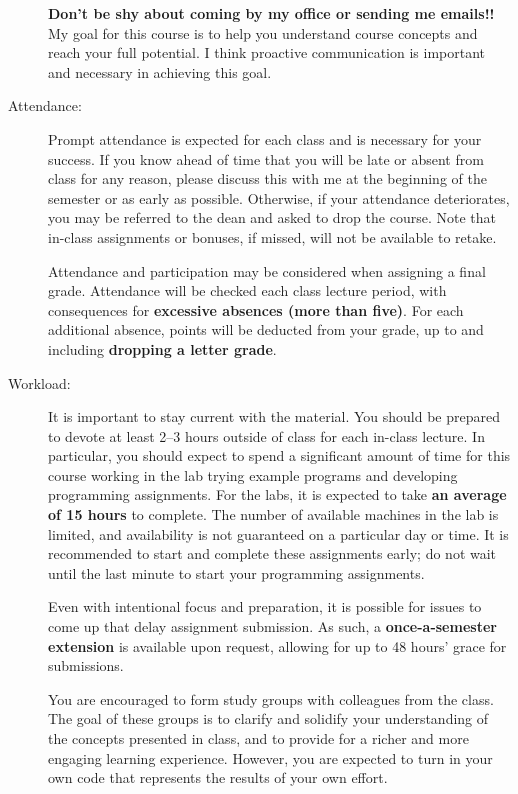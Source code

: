\documentclass [letterpaper,11pt]{article}
\begin{document}
\begin{description}
\textbf{Don't be shy about coming by my office or sending me emails!!}  My goal for this course is to help you understand course concepts and reach your full potential. I think proactive communication is important and necessary in achieving this goal.

\item[Attendance:]
Prompt attendance is expected for each class and is necessary for your success. If you know ahead of time that you will be late or
absent from class for any reason, please discuss this with me at the beginning of the semester
or as early as possible. Otherwise, if your attendance deteriorates, you may be referred to the dean and asked to drop the course. Note that in-class assignments or bonuses, if missed, will not be available to retake.

Attendance and participation may be considered when assigning a final grade.
Attendance will be checked each class lecture period, with consequences for \textbf{excessive absences (more than five)}.  For each additional absence, points will be deducted from your grade, up to and including \textbf{dropping a letter grade}.

\item[Workload:]
It is important to stay current with the material.  You should be prepared to devote at least 2--3 hours outside of class for each in-class lecture.  In particular, you should expect to spend a significant amount of time for this course working in the lab trying example programs and developing programming assignments. For the labs, it is expected to take \textbf{an average of 15 hours} to complete. The number of available machines in the lab is limited, and availability is not guaranteed on a particular day or time.  It is recommended to start and complete these assignments early; do not wait until the last minute to start your programming assignments. 

Even with intentional focus and preparation, it is possible for issues to come up that delay assignment submission.  As such, a \textbf{once-a-semester extension} is available upon request, allowing for up to 48 hours' grace for submissions. 

You are encouraged to form study groups with colleagues from the class. The goal of these groups is to clarify and solidify your understanding of the concepts presented in class, and to provide for a richer and more engaging learning experience. However, you are expected to turn in your own code that represents the results of your own effort.


\end{description}
\end{document}
